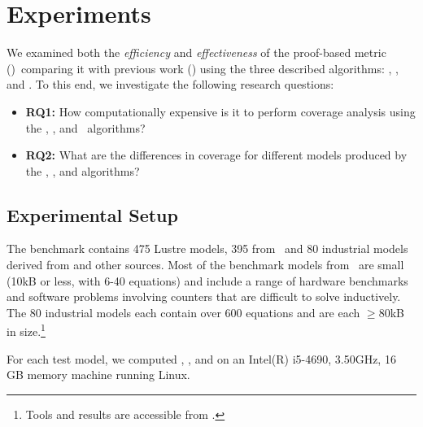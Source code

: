 \section{Experiments}
\label{sec:experiments}

We examined both the {\em efficiency} and {\em
  effectiveness} of the proof-based metric (\ivccov)~comparing it with previous work (\nondetcov) using the three described algorithms: \ucalg, \ucbfalg, and \mustalg. To this end, we investigate the following research questions:
\begin{itemize}
    \item \textbf{RQ1:} How computationally expensive is it to perform coverage analysis using the \ucalg, \ucbfalg, and \mustalg\ algorithms?
    \item \textbf{RQ2:} What are the differences in coverage for different models produced by the \ucalg, \ucbfalg, and \mustalg algorithms?
\end{itemize}

\subsection{Experimental Setup}

The benchmark contains 475 Lustre models, 395 from~\cite{Hagen08:FMCAD} and 80 industrial models derived from \cite{hilt2013} and other sources.  Most of the benchmark models from~\cite{Hagen08:FMCAD} are small (10kB or less, with 6-40 equations) and include a range of hardware benchmarks and software problems involving counters that are difficult to solve inductively.
The 80 industrial models each contain over 600 equations and are each $\geq$80kB in size.\footnote{Tools and results are accessible from \cite{anoexpr}.}

For each test model, we computed \ucalg, \ucbfalg, and \mustalg  on an
Intel(R) i5-4690, 3.50GHz, 16 GB memory machine running Linux.




